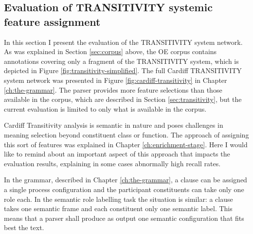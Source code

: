     
    
\subsection{Evaluation of TRANSITIVITY systemic feature assignment}
\label{sec:systemic-evaluation-TRANSITIVITY}
    
    In this section I present the evaluation of the TRANSITIVITY system network. As was explained in Section \ref{sec:corpus} above, the OE corpus contains annotations covering only a fragment of the TRANSITIVITY system, which is depicted in Figure \ref{fig:transitivity-simplified}. The full Cardiff TRANSITIVITY system network was presented in Figure \ref{fig:cardiff-transitivity} in Chapter \ref{ch:the-grammar}. The parser provides more feature selections than those available in the corpus, which are described in Section \ref{sec:transitivity}, but the current evaluation is limited to only what is available in the corpus.
    
    Cardiff Transitivity analysis is semantic in nature and poses challenges in meaning selection beyond constituent class or function. The approach of assigning this sort of features was explained in Chapter \ref{ch:enrichment-stage}. Here I would like to remind about an important aspect of this approach that impacts the evaluation results, explaining in some cases abnormally high recall rates.
    
    In the grammar, described in Chapter \ref{ch:the-grammar}, a clause can be assigned a single process configuration and the participant constituents can take only one role each. In the semantic role labelling task the situation is similar: a clause takes one semantic frame and each constituent only one semantic label. This means that a parser shall produce as output one semantic configuration that fits best the text. 
    
